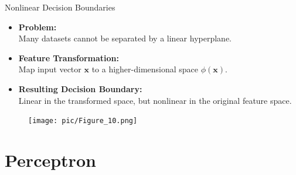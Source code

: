 \documentclass[serif, aspectratio=169]{beamer}
\begin{document}
    \begin{frame}{Nonlinear Decision Boundaries}
        \begin{itemize}\itemsep1em
        \item \textbf{Problem:}\\ Many datasets cannot be separated by a linear hyperplane.
        \item \textbf{Feature Transformation:}\\ Map input vector $\mathbf{x}$ to a higher-dimensional space $\phi(\mathbf{x})$.
        \item \textbf{Resulting Decision Boundary:}\\ Linear in the transformed space, but nonlinear in the original feature space.
        \end{itemize}
        \endminipage
        \hfill
        \begin{figure}
            \texttt{[image: pic/Figure\_10.png]}
        \end{figure}
        \endminipage
        \vfill
    \end{frame}


    \section{Perceptron}
\end{document}
